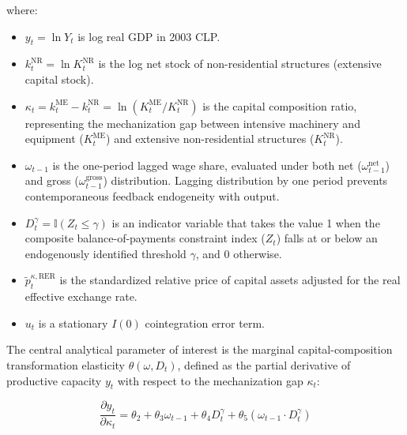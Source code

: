 where:
\begin{itemize}
	\item $y_t = \ln Y_t$ is log real GDP in 2003 CLP.
	\item $k_t^{\text{NR}} = \ln K_t^{\text{NR}}$ is the log net stock of non-residential structures (extensive capital stock).
	\item $\kappa_t = k_t^{\text{ME}} - k_t^{\text{NR}} = \ln(K_t^{\text{ME}} / K_t^{\text{NR}})$ is the capital composition ratio, representing the mechanization gap between intensive machinery and equipment ($K_t^{\text{ME}}$) and extensive non-residential structures ($K_t^{\text{NR}}$).
	\item $\omega_{t-1}$ is the one-period lagged wage share, evaluated under both net ($\omega_{t-1}^{\text{net}}$) and gross ($\omega_{t-1}^{\text{gross}}$) distribution. Lagging distribution by one period prevents contemporaneous feedback endogeneity with output.
	\item $D_t^{\gamma} = \mathbb{I}(Z_t \le \gamma)$ is an indicator variable that takes the value 1 when the composite balance-of-payments constraint index ($Z_t$) falls at or below an endogenously identified threshold $\gamma$, and 0 otherwise.
	\item $\tilde{p}_t^{\kappa, \text{RER}}$ is the standardized relative price of capital assets adjusted for the real effective exchange rate.
	\item $u_t$ is a stationary $I(0)$ cointegration error term.
\end{itemize}

The central analytical parameter of interest is the marginal capital-composition transformation elasticity $\theta(\omega, D_t)$, defined as the partial derivative of productive capacity $y_t$ with respect to the mechanization gap $\kappa_t$:

\begin{equation}
	\frac{\partial y_t}{\partial \kappa_t} = \theta_2 + \theta_3 \omega_{t-1} + \theta_4 D_t^{\gamma} + \theta_5 (\omega_{t-1} \cdot D_t^{\gamma})
\end{equation}


